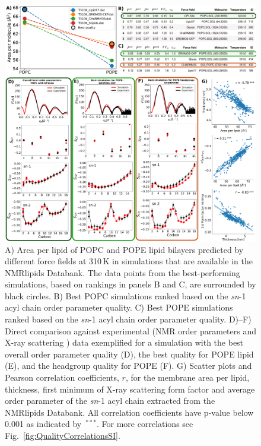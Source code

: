 \documentclass[fleqn,10pt]{wlscirep}
\begin{document}
\begin{figure}[!t]
    \centering
    \includegraphics[width=\linewidth]{Figures/quality5.pdf}
    \caption{ A) Area per lipid of POPC and POPE lipid bilayers predicted by different force fields at 310\,K in simulations that are available in the NMRlipids Databank. The data points from the best-performing simulations, based on rankings in panels B and C, are surrounded by black circles. 
    B) Best POPC simulations ranked based on the \textit{sn}-1 acyl chain order parameter quality.
    C) Best POPE simulations ranked based on the \textit{sn}-1 acyl chain order parameter quality. 
    D)--F) Direct comparison against experimental (NMR order parameters and X-ray scattering ) data exemplified for a simulation with the best overall order parameter quality (D), the best quality for POPE lipid (E), and the headgroup quality for POPE (F).
    G) Scatter plots and Pearson correlation coefficients, $r$, for the membrane area per lipid, thickness, first minimum of X-ray scattering form factor and average order parameter of the \textit{sn}-1 acyl chain extracted from the NMRlipids Databank. All correlation coefficients have p-value below 0.001 as indicated by~$^{***}$. For more correlations see Fig.~\ref{fig:QualityCorrelationsSI}.
    }
    \label{fig:quality}
\end{figure}


\end{document}
